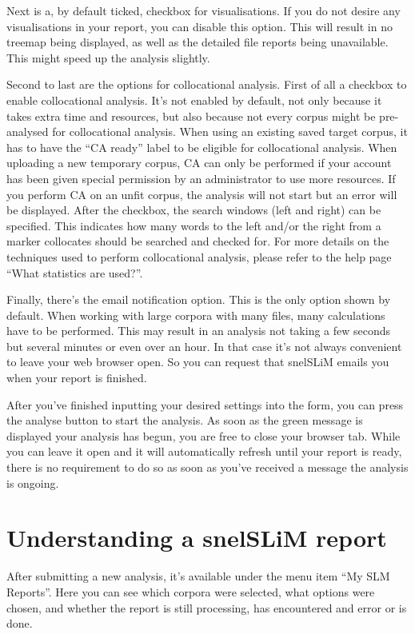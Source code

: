 \documentclass[11pt,a4paper]{article}
\begin{document}
Next is a, by default ticked, checkbox for visualisations. If you do not desire any visualisations in your report, you can disable this option. This will result in no treemap being displayed, as well as the detailed file reports being unavailable. This might speed up the analysis slightly.

Second to last are the options for collocational analysis. First of all a checkbox to enable collocational analysis. It's not enabled by default, not only because it takes extra time and resources, but also because not every corpus might be pre-analysed for collocational analysis. When using an existing saved target corpus, it has to have the ``CA ready'' label to be eligible for collocational analysis. When uploading a new temporary corpus, CA can only be performed if your account has been given special permission by an administrator to use more resources. If you perform CA on an unfit corpus, the analysis will not start but an error will be displayed. After the checkbox, the search windows (left and right) can be specified. This indicates how many words to the left and/or the right from a marker collocates should be searched and checked for. For more details on the techniques used to perform collocational analysis, please refer to the help page ``What statistics are used?''.

Finally, there's the email notification option. This is the only option shown by default. When working with large corpora with many files, many calculations have to be performed. This may result in an analysis not taking a few seconds but several minutes or even over an hour. In that case it's not always convenient to leave your web browser open. So you can request that snelSLiM emails you when your report is finished.

After you've finished inputting your desired settings into the form, you can press the analyse button to start the analysis. As soon as the green message is displayed your analysis has begun, you are free to close your browser tab. While you can leave it open and it will automatically refresh until your report is ready, there is no requirement to do so as soon as you've received a message the analysis is ongoing.

\section{Understanding a snelSLiM report}

After submitting a new analysis, it's available under the menu item ``My SLM Reports''. Here you can see which corpora were selected, what options were chosen, and whether the report is still processing, has encountered and error or is done.
\end{document}
